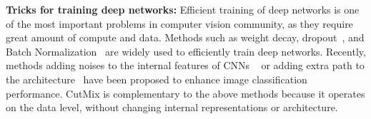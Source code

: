 \noindent\textbf{Tricks for training deep networks: }
Efficient training of deep networks is one of the most important problems in computer vision community, as they require great amount of compute and data.
Methods such as weight decay, dropout~\cite{Dropout}, and Batch Normalization~\cite{BN} are widely used to efficiently train deep networks. 
Recently, methods adding noises to the internal features of CNNs ~\cite{stochasticdepth,ghiasi2018dropblock,yamada2018shakedrop} or adding extra path to the architecture~\cite{SENet,GENet} have been proposed to enhance image classification performance. 
CutMix is complementary to the above methods because it operates on the data level, without changing internal representations or architecture.

